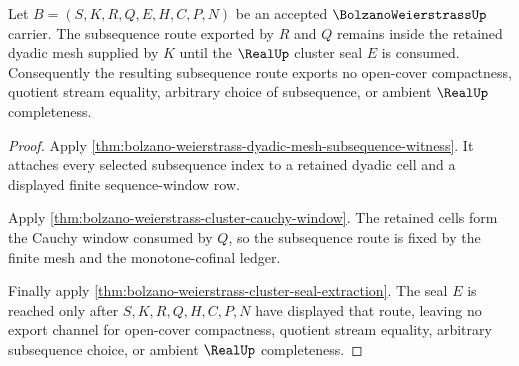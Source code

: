 \begin{theorem}
\label{thm:bolzano-weierstrass-subsequence-nonescape}
Let $B=(S,K,R,Q,E,H,C,P,N)$ be an accepted $\BolzanoWeierstrassUp$ carrier. The subsequence route exported by $R$ and $Q$ remains inside the retained dyadic mesh supplied by $K$ until the $\RealUp$ cluster seal $E$ is consumed. Consequently the resulting subsequence route exports no open-cover compactness, quotient stream equality, arbitrary choice of subsequence, or ambient $\RealUp$ completeness.
\end{theorem}
\begin{proof}
Apply \autoref{thm:bolzano-weierstrass-dyadic-mesh-subsequence-witness}. It attaches every selected subsequence index to a retained dyadic cell and a displayed finite sequence-window row.

Apply \autoref{thm:bolzano-weierstrass-cluster-cauchy-window}. The retained cells form the Cauchy window consumed by $Q$, so the subsequence route is fixed by the finite mesh and the monotone-cofinal ledger.

Finally apply \autoref{thm:bolzano-weierstrass-cluster-seal-extraction}. The seal $E$ is reached only after $S,K,R,Q,H,C,P,N$ have displayed that route, leaving no export channel for open-cover compactness, quotient stream equality, arbitrary subsequence choice, or ambient $\RealUp$ completeness.
\end{proof}


